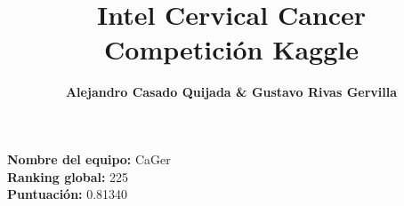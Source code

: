 \documentclass[10pt,a4paper]{article}
\author{\textbf{Alejandro Casado Quijada \& Gustavo Rivas Gervilla}}
\title{\textcolor{deepblue}{\textbf{Intel Cervical Cancer \\Competición Kaggle}}}
\date{}
\begin{document}
\maketitle

\begin{center}
  \textbf{Nombre del equipo: }CaGer\\
  \textbf{Ranking global: }225\\
  \textbf{Puntuación: }0.81340
\end{center}

\newpage

\tableofcontents

\newpage











\end{document}
